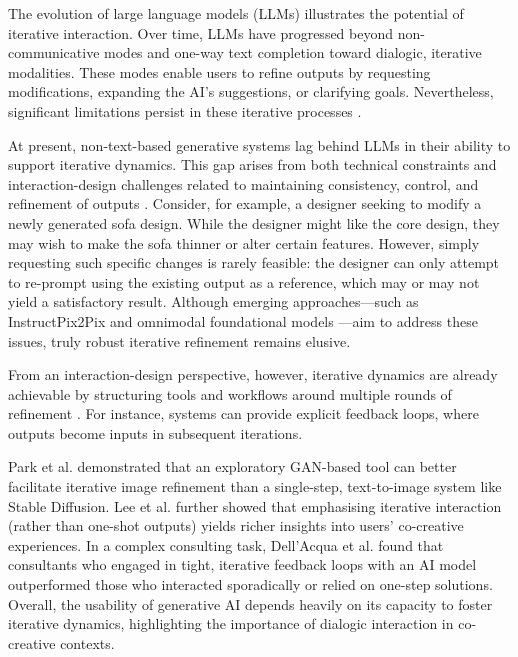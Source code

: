 The evolution of large language models (LLMs) illustrates the potential of iterative interaction. Over time, LLMs have progressed beyond non-communicative modes and one-way text completion toward dialogic, iterative modalities. These modes enable users to refine outputs by requesting modifications, expanding the AI’s suggestions, or clarifying goals. Nevertheless, significant limitations persist in these iterative processes \cite{Bown2024-yx, Ocampo2024-dv}.

At present, non-text-based generative systems lag behind LLMs in their ability to support iterative dynamics. This gap arises from both technical constraints and interaction-design challenges related to maintaining consistency, control, and refinement of outputs \cite{Ocampo2024-dv}. Consider, for example, a designer seeking to modify a newly generated sofa design. While the designer might like the core design, they may wish to make the sofa thinner or alter certain features. However, simply requesting such specific changes is rarely feasible: the designer can only attempt to re-prompt using the existing output as a reference, which may or may not yield a satisfactory result. Although emerging approaches—such as InstructPix2Pix \cite{Brooks2022-vo} and omnimodal foundational models \cite{Pichai2024-ao}—aim to address these issues, truly robust iterative refinement remains elusive.

From an interaction-design perspective, however, iterative dynamics are already achievable by structuring tools and workflows around multiple rounds of refinement \cite{Koch2020-gx, Lee2022-rj, Kim2023-wt}. For instance, systems can provide explicit feedback loops, where outputs become inputs in subsequent iterations.

Park et al. \cite{Park2024-gw} demonstrated that an exploratory GAN-based tool can better facilitate iterative image refinement than a single-step, text-to-image system like Stable Diffusion. Lee et al. \cite{Lee2022-rj} further showed that emphasising iterative interaction (rather than one-shot outputs) yields richer insights into users’ co-creative experiences. In a complex consulting task, Dell’Acqua et al. \cite{DellAcqua2023-og} found that consultants who engaged in tight, iterative feedback loops with an AI model outperformed those who interacted sporadically or relied on one-step solutions. Overall, the usability of generative AI depends heavily on its capacity to foster iterative dynamics, highlighting the importance of dialogic interaction in co-creative contexts.

